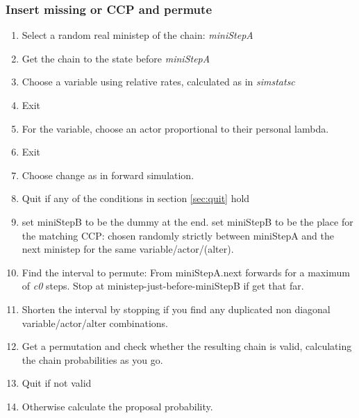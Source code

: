\documentclass[12pt,a4paper]{article}
\renewcommand{\=}{\,=\,}
\newcommand{\+}{\,+\,}
\newcommand{\nnm}[1]{\textsf{\small\textit{#1}}}
\begin{document}
\subsubsection{Insert missing or CCP and permute}
\begin{enumerate}
\item Select a random real ministep of the chain: \nnm{miniStepA}
\item Get the chain to the state before \nnm{miniStepA}
\item Choose a variable
  using relative rates, calculated as in \nnm{simstatsc}
\item \begin{algorithmic}
\STATE Exit
\end{algorithmic}
\item  For the variable, choose an actor proportional to their personal lambda.
\item \begin{algorithmic}
\STATE Exit
\ENDIF
\end{algorithmic}
\item Choose change as in forward simulation.
\item Quit if any of the conditions in section \ref{sec:quit} hold
\item \begin{algorithmic}
\STATE set miniStepB to be the dummy at the end.
\ELSE
\STATE set miniStepB to be the place for the matching CCP: chosen
randomly strictly between miniStepA and the next ministep for the same
variable/actor/(alter).
\ENDIF
\end{algorithmic}
\item Find the interval to permute: From miniStepA.next forwards for a maximum
of \nnm{c0} steps. Stop at ministep-just-before-miniStepB if get that far.
\item Shorten the interval by stopping if you find any duplicated non diagonal
  variable/actor/alter combinations.
\item Get a permutation and check whether the resulting chain is valid,
  calculating the chain probabilities as you go.
\item Quit if not valid
\item Otherwise calculate the proposal probability. \\

\end{enumerate}
\end{document}
